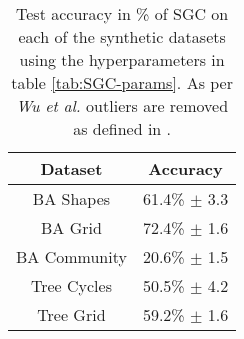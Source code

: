 \begin{table}
    \centering
    \begin{tabular}{c|c}
        \textbf{Dataset} & \textbf{Accuracy} \\
        \midrule
        BA Shapes       & 61.4\% $\pm$ 3.3 \\
        BA Grid         & 72.4\% $\pm$ 1.6 \\
        BA Community    & 20.6\% $\pm$ 1.5 \\
        Tree Cycles     & 50.5\% $\pm$ 4.2 \\
        Tree Grid       & 59.2\% $\pm$ 1.6 \\
    \end{tabular}
    \caption{Test accuracy in \% of SGC on each of the synthetic datasets using the hyperparameters in table \ref{tab:SGC-params}. As per \textit{Wu et al.}\cite{wu2019simplifying} outliers are removed as defined in .}
    \label{tab:GCN-acc}
\end{table}

